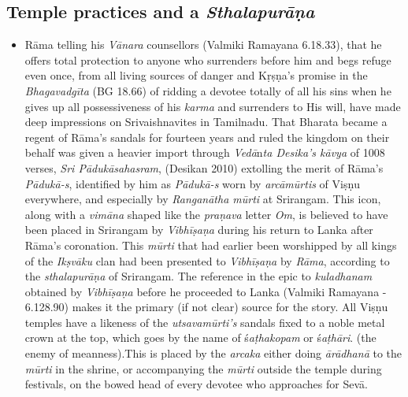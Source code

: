\subsection*{Temple practices and a \textit{Sthalapurāṇa}}

\begin{itemize}
\item Rāma telling his \textit{Vānara} counsellors (Valmiki Ramayana 6.18.33), that he offers total protection to anyone who surrenders before him and begs refuge even once, from all living sources of danger and Kṛṣṇa’s promise in the \textit{Bhagavadgīta} (BG 18.66) of ridding a devotee totally of all his sins when he gives up all possessiveness of his \textit{karma} and surrenders to His will, have made deep impressions on Srivaishnavites in Tamilnadu. That Bharata became a regent of Rāma’s sandals for fourteen years and ruled the kingdom on their behalf was given a heavier import through \textit{Vedā}n\textit{ta Desika’s kāvya} of 1008 verses, \textit{Sri Pādukāsahasram}, (Desikan 2010) extolling the merit of Rāma’s \textit{Pādukā-s}, identified by him as \textit{Pādukā-s} worn by \textit{arcāmūrtis} of Viṣṇu everywhere, and especially by \textit{Ranganātha mūrti} at Srirangam. This icon, along with a \textit{vimāna} shaped like the \textit{praṇava} letter \textit{Om}, is believed to have been placed in Srirangam by \textit{Vibhīṣaṇa} during his return to Lanka after Rāma’s coronation. This \textit{mūrti} that had earlier been worshipped by all kings of the \textit{Ikṣvāku} clan had been presented to \textit{Vibhīṣaṇa} by \textit{Rāma}, according to the \textit{sthalapurāṇa} of Srirangam. The reference in the epic to \textit{kuladhanam} obtained by \textit{Vibhīṣaṇa} before he proceeded to Lanka (Valmiki Ramayana - 6.128.90) makes it the primary (if not clear) source for the story. All Viṣṇu temples have a likeness of the \textit{utsavamūrti’s} sandals fixed to a noble metal crown at the top, which goes by the name of ś\textit{aṭhakopam} or ś\textit{aṭhāri}. (the enemy of meanness).This is placed by the \textit{arcaka} either doing \textit{ārādhanā} to the \textit{mūrti} in the shrine, or accompanying the \textit{mūrti} outside the temple during festivals, on the bowed head of every devotee who approaches for Sevā.

\end{itemize}


